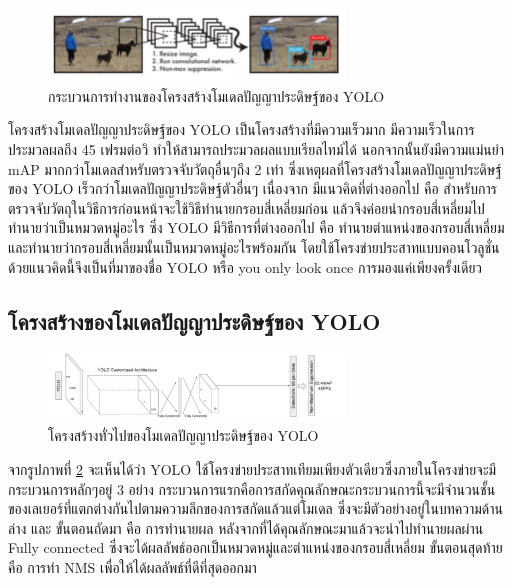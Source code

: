 \begin{figure}[!ht]
    \centering
    \includegraphics[width=0.7\textwidth]{chapter2/images/yolo.jpg}
    \caption{กระบวนการทำงานของโครงสร้างโมเดลปัญญาประดิษฐ์ของ YOLO}
    \label{fig:yolo}
\end{figure}

โครงสร้างโมเดลปัญญาประดิษฐ์ของ YOLO เป็นโครงสร้างที่มีความเร็วมาก มีความเร็วในการประมวลผลถึง 45 เฟรมต่อวิ ทำให้สามารถประมวลผลแบบเรียลไทม์ได้ นอกจากนั้นยังมีความแม่นยำ mAP มากกว่าโมเดลสำหรับตรวจจับวัตถุอื่นๆถึง 2 เท่า ซึ่งเหตุผลที่โครงสร้างโมเดลปัญญาประดิษฐ์ของ YOLO เร็วกว่าโมเดลปัญญาประดิษฐ์ตัวอื่นๆ เนื่องจาก มีแนวคิดที่ต่างออกไป คือ สำหรับการตรวจจับวัตถุในวิธีการก่อนหน้าจะใช้วิธีทำนายกรอบสี่เหลี่ยมก่อน แล้วจึงค่อยนำกรอบสี่เหลี่ยมไปทำนายว่าเป็นหมวดหมู่อะไร ซึ่ง YOLO มีวิธีการที่ต่างออกไป คือ ทำนายตำแหน่งของกรอบสี่เหลี่ยมและทำนายว่ากรอบสี่เหลี่ยมนั้นเป็นหมวดหมู่อะไรพร้อมกัน โดยใช้โครงข่ายประสาทแบบคอนโวลูชั่น ด้วยแนวคิดนี้จึงเป็นที่มาของชื่อ YOLO หรือ you only look once การมองแค่เพียงครั้งเดียว 
\subsection*{โครงสร้างของโมเดลปัญญาประดิษฐ์ของ YOLO} 
\begin{figure}[!ht]
    \centering
    \includegraphics[width=0.7\textwidth]{chapter2/images/yolo_architecture.jpg}
    \caption{โครงสร้างทั่วไปของโมเดลปัญญาประดิษฐ์ของ YOLO}
    \label{fig:yolo_architecture}
\end{figure}

จากรูปภาพที่ \ref{fig:yolo_architecture} จะเห็นได้ว่า YOLO ใช้โครงข่ายประสาทเทียมเพียงตัวเดียวซึ่งภายในโครงข่ายจะมีกระบวนการหลักๆอยู่ 3 อย่าง กระบวนการแรกคือการสกัดคุณลักษณะกระบวนการนี้จะมีจำนวนชั้นของเลเยอร์ที่แตกต่างกันไปตามความลึกของการสกัดแล้วแต่โมเดล ซึ่งจะมีตัวอย่างอยู่ในบทความด้านล่าง และ ขั้นตอนถัดมา คือ การทำนายผล หลังจากที่ได้คุณลักษณะมาแล้วจะนำไปทำนายผลผ่าน Fully connected ซึ่งจะได้ผลลัพธ์ออกเป็นหมวดหมู่และตำแหน่งของกรอบสี่เหลี่ยม ขั้นตอนสุดท้ายคือ การทำ NMS เพื่อให้ได้ผลลัพธ์ที่ดีที่สุดออกมา



